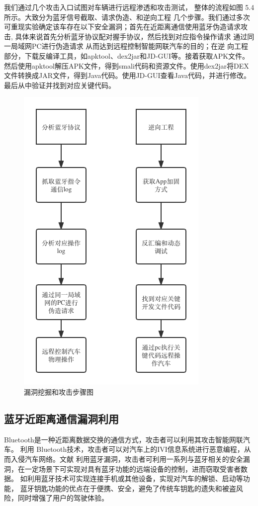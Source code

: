 我们通过几个攻击入口试图对车辆进行远程渗透和攻击测试，
整体的流程如图 5.4所示。大致分为蓝牙信号截取、请求伪造、和逆向工程
几个步骤。我们通过多次可重现实验确定该车存在以下安全漏洞；首先在近距离通信使用蓝牙伪造请求攻击, 具体来说首先分析蓝牙协议配对握手协议，然后找到对应指令操作请求
通过同一局域网PC进行伪造请求 从而达到远程控制智能网联汽车的目的；在逆
向工程部分，下载反编译工具，如apktool、dex2jar和JD-GUI等。接着获取APK文件。然后使用apktool解压APK文件，得到smali代码和资源文件。使用dex2jar将DEX文件转换成JAR文件，得到Java代码。使用JD-GUI查看Java代码，并进行修改。最后从中验证并找到对应关键代码。
\begin{figure}
  \centering
  \includegraphics[scale=0.5]{resources/img/i23.png}
  \caption{漏洞挖掘和攻击步骤图}
\end{figure}
\newline
\subsection {蓝牙近距离通信漏洞利用}
Bluetooth是一种近距离数据交换的通信方式，攻击者可以利用其攻击智能网联汽车。
利用 Bluetooth技术，攻击者可以对汽车上的IVI信息系统进行恶意编程，从而入侵汽车网络。文献\cite{antian}
利用蓝牙漏洞，攻击者可利用一系列与蓝牙相关的安全漏洞，在一定场景下可实现对具有蓝牙功能的远端设备的控制，进而窃取受害者数据。
如利用蓝牙技术可实现连接手机或其他设备，实现对汽车的解锁、启动等功能，
蓝牙钥匙功能的优点在于便携、安全，避免了传统车钥匙的遗失和被盗风险，同时增强了用户的驾驶体验。
